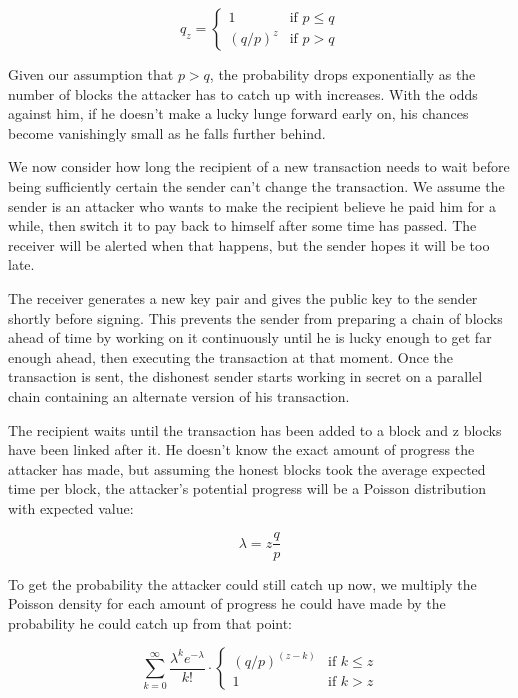 \documentclass{article}
\begin{document}
\begin{equation}
q_z = \begin{cases}
1 & \text{if } p \leq q \\
(q/p)^z & \text{if } p > q
\end{cases}
\end{equation}

Given our assumption that $p > q$, the probability drops exponentially as the number of blocks the attacker has to catch up with increases. With the odds against him, if he doesn't make a lucky lunge forward early on, his chances become vanishingly small as he falls further behind.

We now consider how long the recipient of a new transaction needs to wait before being sufficiently certain the sender can't change the transaction. We assume the sender is an attacker who wants to make the recipient believe he paid him for a while, then switch it to pay back to himself after some time has passed. The receiver will be alerted when that happens, but the sender hopes it will be too late.

The receiver generates a new key pair and gives the public key to the sender shortly before signing. This prevents the sender from preparing a chain of blocks ahead of time by working on it continuously until he is lucky enough to get far enough ahead, then executing the transaction at that moment. Once the transaction is sent, the dishonest sender starts working in secret on a parallel chain containing an alternate version of his transaction.

The recipient waits until the transaction has been added to a block and z blocks have been linked after it. He doesn't know the exact amount of progress the attacker has made, but assuming the honest blocks took the average expected time per block, the attacker's potential progress will be a Poisson distribution with expected value:

\begin{equation}
\lambda = z \frac{q}{p}
\end{equation}

To get the probability the attacker could still catch up now, we multiply the Poisson density for each amount of progress he could have made by the probability he could catch up from that point:

\begin{equation}
\sum_{k=0}^{\infty} \frac{\lambda^k e^{-\lambda}}{k!} \cdot
\begin{cases}
(q/p)^{(z-k)} & \text{if } k \leq z \\
1 & \text{if } k > z
\end{cases}
\end{equation}
\end{document}
